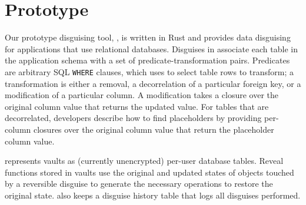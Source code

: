 \section{Prototype}
\label{sec:proto}
%
Our prototype disguising tool, \sys, is written in Rust and
provides data disguising for applications that use relational databases.
%
Disguises in \sys associate each table in the application schema with a set of
predicate-transformation pairs.
%
Predicates are arbitrary SQL \texttt{WHERE} clauses, which \sys uses
to select table rows to transform; a transformation is either a removal, a
decorrelation of a particular foreign key, or a modification of a particular
column.
%
A modification takes a closure over the original column value that returns the
updated value.
%
For tables that are decorrelated, developers describe how to find placeholders
by providing per-column closures over the original column value that return the
placeholder column value.
%

%
\sys represents vaults as (currently unencrypted) per-user database tables.
%
Reveal functions stored in vaults use the original and updated states of objects
touched by a reversible disguise to generate the necessary operations to restore the
original state.
%
\sys also keeps a disguise history table that logs all disguises performed.

\iffalse
\sys also provides a specification of the end-state after it applies a sequence of
disguises; this allows developers to double-check that their disguises achieve their privacy
transformation goals.
%
To do so, \sys automatically generates a sequence of materialized view filters that, when applied on top of each
other, correspond to the state achieved by composing the disguises.
Developers specify assertions (\eg all objects belonging to departing user Bob have
been removed) that \sys ensures holds on the materialized view specification.

\sys's composition technique may reorder filters from one disguise with those from a subsequent disguise in order to achieve the
correct result.
%
\sys maps these filters directly to physical database operations (where reordering filters corresponds to
temporarily undoing vault entries). Thus, the developer can use the materialized view filters as a way to
test the correctness of \sys and their disguises prior to permanently altering the application database.
\fi
